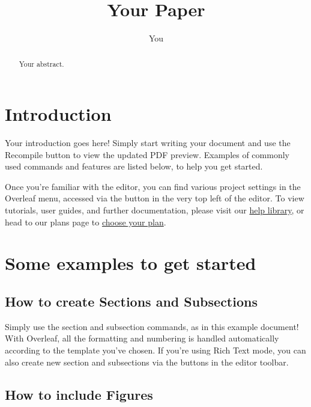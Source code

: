 \documentclass{article}
\title{Your Paper}
\author{You}
\begin{document}
\maketitle

\begin{abstract}
	Your abstract.
\end{abstract}





\section{Introduction}

Your introduction goes here!
 Simply start writing your document and use the Recompile button to view the updated PDF preview.
 Examples of commonly used commands and features are listed below,
 to help you get started.


Once you're familiar with the editor,
 you can find various project settings in the Overleaf menu,
 accessed via the button in the very top left of the editor.
 To view tutorials,
 user guides,
 and further documentation,
 please visit our \href{https:
//www.
overleaf.
com/learn}{help library},
 or head to our plans page to \href{https:
//www.
overleaf.
com/user/subscription/plans}{choose your plan}.





\section{Some examples to get started}





\subsection{How to create Sections and Subsections}

Simply use the section and subsection commands,
 as in this example document!
 With Overleaf,
 all the formatting and numbering is handled automatically according to the template you've chosen.
 If you're using Rich Text mode,
 you can also create new section and subsections via the buttons in the editor toolbar.





\subsection{How to include Figures}
\end{document}
